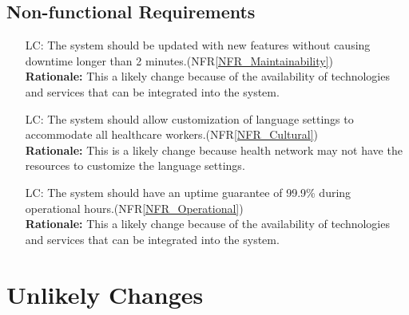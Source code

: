 \documentclass[12pt]{article}
\newcounter{lcnum} %
\begin{document}
\subsection{Non-functional Requirements}
\noindent \begin{itemize}
  \item[LC\refstepcounter{lcnum}\thelcnum\label{LC_maintainability}:] The system should be updated with new features without causing downtime longer than 2 minutes.(NFR\ref{NFR_Maintainability})\\
  \textbf{Rationale:} This a likely change because of the availability of technologies and services that can be integrated into the system.

  \item[LC\refstepcounter{lcnum}\thelcnum\label{LC_cultural}:] The system should allow customization of language settings to accommodate all healthcare workers.(NFR\ref{NFR_Cultural})\\
  \textbf{Rationale:} This is a likely change because health network may not have the resources to customize the language settings.

  \item[LC\refstepcounter{lcnum}\thelcnum\label{LC_operational}:] The system should have an uptime guarantee of 99.9\% during operational hours.(NFR\ref{NFR_Operational})\\
  \textbf{Rationale:} This a likely change because of the availability of technologies and services that can be integrated into the system.

\end{itemize}



\section{Unlikely Changes}   
\end{document}
